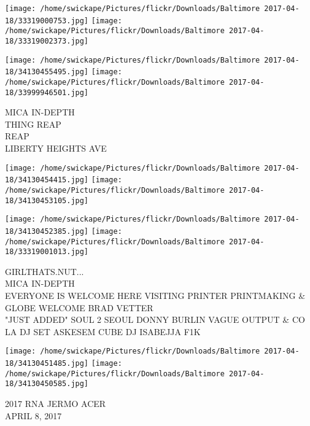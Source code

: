 \documentclass[10pt,letterpaper]{article}
\begin{document}
\texttt{[image: /home/swickape/Pictures/flickr/Downloads/Baltimore 2017-04-18/33319000753.jpg]}
\texttt{[image: /home/swickape/Pictures/flickr/Downloads/Baltimore 2017-04-18/33319002373.jpg]}

\texttt{[image: /home/swickape/Pictures/flickr/Downloads/Baltimore 2017-04-18/34130455495.jpg]}
\texttt{[image: /home/swickape/Pictures/flickr/Downloads/Baltimore 2017-04-18/33999946501.jpg]}

MICA IN{-}DEPTH\\
THING REAP\\
REAP\\
LIBERTY HEIGHTS AVE
\pagebreak

\texttt{[image: /home/swickape/Pictures/flickr/Downloads/Baltimore 2017-04-18/34130454415.jpg]}
\texttt{[image: /home/swickape/Pictures/flickr/Downloads/Baltimore 2017-04-18/34130453105.jpg]}

\texttt{[image: /home/swickape/Pictures/flickr/Downloads/Baltimore 2017-04-18/34130452385.jpg]}
\texttt{[image: /home/swickape/Pictures/flickr/Downloads/Baltimore 2017-04-18/33319001013.jpg]}

GIRLTHATS.NUT...\\
MICA IN{-}DEPTH\\
EVERYONE IS WELCOME HERE VISITING PRINTER PRINTMAKING \& GLOBE WELCOME BRAD VETTER\\
"JUST ADDED" SOUL 2 SEOUL DONNY BURLIN VAGUE OUTPUT \& CO LA DJ SET ASKESEM CUBE DJ ISABEJJA F1K
\pagebreak

\texttt{[image: /home/swickape/Pictures/flickr/Downloads/Baltimore 2017-04-18/34130451485.jpg]}
\texttt{[image: /home/swickape/Pictures/flickr/Downloads/Baltimore 2017-04-18/34130450585.jpg]}

2017 RNA JERMO ACER\\
APRIL 8, 2017
\pagebreak
\end{document}

